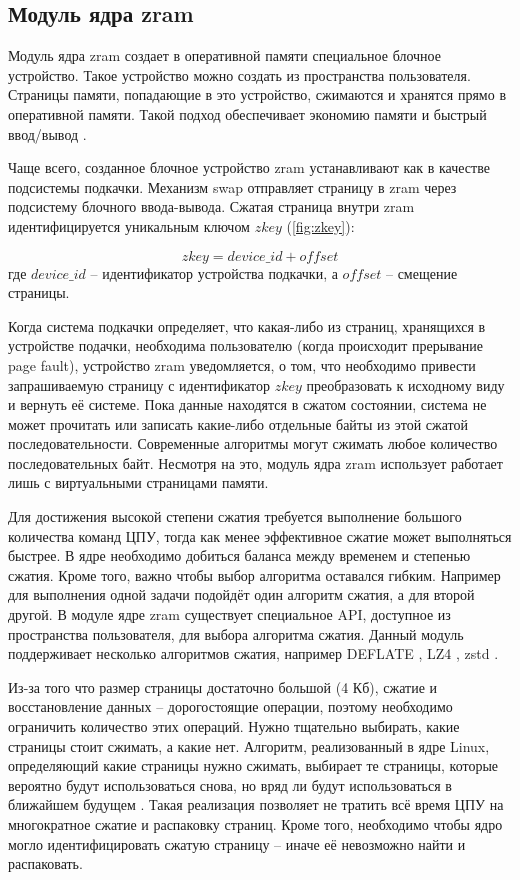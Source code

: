 \subsection{Модуль ядра zram}

Модуль ядра zram создает в оперативной памяти специальное блочное устройство. Такое устройство можно создать из пространства пользователя. Страницы памяти, попадающие в это устройство, сжимаются и хранятся прямо в оперативной памяти. Такой подход обеспечивает экономию памяти и быстрый ввод/вывод \cite{zram}. 

Чаще всего, созданное блочное устройство zram устанавливают как в качестве подсистемы подкачки. Механизм swap отправляет страницу в zram через подсистему блочного ввода-вывода. Сжатая страница внутри zram идентифицируется уникальным ключом $zkey$ (\ref{fig:zkey}):

\begin{equation}\label{fig:zkey}
	zkey = device\_id + offset
\end{equation}
где $device\_id$ -- идентификатор устройства подкачки, а $offset$ -- смещение страницы.

Когда система подкачки определяет, что какая-либо из страниц, хранящихся в устройстве подачки, необходима пользователю (когда происходит прерывание page fault), устройство zram уведомляется, о том, что необходимо привести запрашиваемую страницу с идентификатор $zkey$ преобразовать к исходному виду и вернуть её системе. Пока данные находятся в сжатом состоянии, система не может прочитать или записать какие-либо отдельные байты из этой сжатой последовательности. Современные алгоритмы могут сжимать любое количество последовательных байт. Несмотря на это, модуль ядра zram использует работает лишь с виртуальными страницами памяти.

Для достижения высокой степени сжатия требуется выполнение большого количества команд ЦПУ, тогда как менее эффективное сжатие может выполняться быстрее. В ядре необходимо добиться баланса между временем и степенью сжатия. Кроме того, важно чтобы выбор алгоритма оставался гибким. Например для выполнения одной задачи подойдёт один алгоритм сжатия, а для второй другой. В модуле ядре zram существует специальное API, доступное из пространства пользователя, для выбора алгоритма сжатия. Данный модуль поддерживает несколько алгоритмов сжатия, например DEFLATE \cite{deflate}, LZ4 \cite{lz4}, zstd \cite{zstd}. 

Из-за того что размер страницы достаточно большой (4 Кб), сжатие и восстановление данных -- дорогостоящие операции, поэтому необходимо ограничить количество этих операций. Нужно тщательно выбирать, какие страницы стоит сжимать, а какие нет. Алгоритм, реализованный в ядре Linux, определяющий какие страницы нужно сжимать, выбирает те страницы, которые вероятно будут использоваться снова, но вряд ли будут использоваться в ближайшем будущем \cite{in-kernel-memory-compression}. Такая реализация позволяет не тратить всё время ЦПУ на многократное сжатие и распаковку страниц. Кроме того, необходимо чтобы ядро могло идентифицировать сжатую страницу -- иначе её невозможно найти и распаковать.


